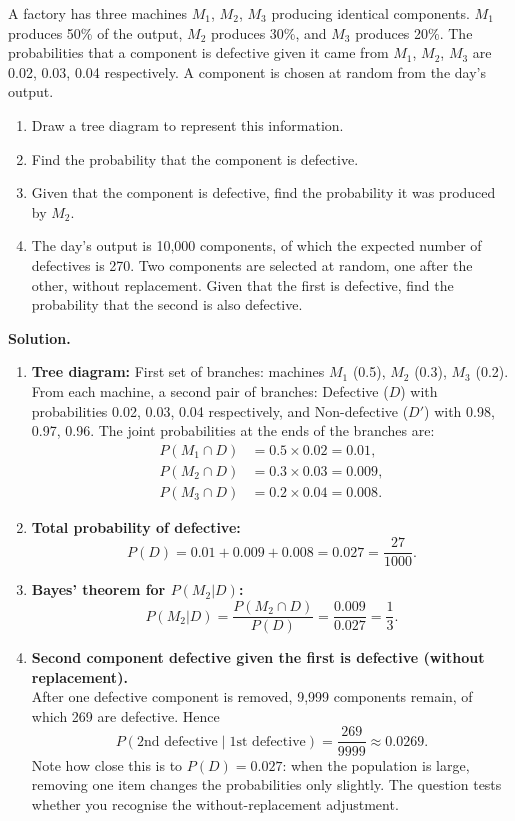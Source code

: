 \documentclass[11pt]{article}
\begin{document}
\begin{exoresolu}
A factory has three machines $M_1$, $M_2$, $M_3$ producing identical components. $M_1$ produces 50\% of the output, $M_2$ produces 30\%, and $M_3$ produces 20\%. The probabilities that a component is defective given it came from $M_1$, $M_2$, $M_3$ are 0.02, 0.03, 0.04 respectively. A component is chosen at random from the day's output.
\begin{enumerate}
    \item Draw a tree diagram to represent this information.
    \item Find the probability that the component is defective.
    \item Given that the component is defective, find the probability it was produced by $M_2$.
    \item The day's output is 10,000 components, of which the expected number of defectives is 270. Two components are selected at random, one after the other, without replacement. Given that the first is defective, find the probability that the second is also defective.
\end{enumerate}
\tcblower
\textbf{Solution.}
\begin{enumerate}
    \item \textbf{Tree diagram:} First set of branches: machines $M_1$ (0.5), $M_2$ (0.3), $M_3$ (0.2). From each machine, a second pair of branches: Defective ($D$) with probabilities 0.02, 0.03, 0.04 respectively, and Non-defective ($D'$) with 0.98, 0.97, 0.96. The joint probabilities at the ends of the branches are:
    \begin{align*}
        P(M_1 \cap D) &= 0.5 \times 0.02 = 0.01, \\
        P(M_2 \cap D) &= 0.3 \times 0.03 = 0.009, \\
        P(M_3 \cap D) &= 0.2 \times 0.04 = 0.008.
    \end{align*}
    \item \textbf{Total probability of defective:}
    \[
    P(D) = 0.01 + 0.009 + 0.008 = 0.027 = \frac{27}{1000}.
    \]
    \item \textbf{Bayes' theorem for $P(M_2|D)$:}
    \[
    P(M_2|D) = \frac{P(M_2 \cap D)}{P(D)} = \frac{0.009}{0.027} = \frac{1}{3}.
    \]
    \item \textbf{Second component defective given the first is defective (without replacement).}\\
    After one defective component is removed, 9,999 components remain, of which 269 are defective. Hence
    \[
    P(\text{2nd defective} \mid \text{1st defective}) = \frac{269}{9999} \approx 0.0269.
    \]
    Note how close this is to $P(D)=0.027$: when the population is large, removing one item changes the probabilities only slightly. The question tests whether you recognise the without-replacement adjustment.
\end{enumerate}
\end{exoresolu}
\end{document}
